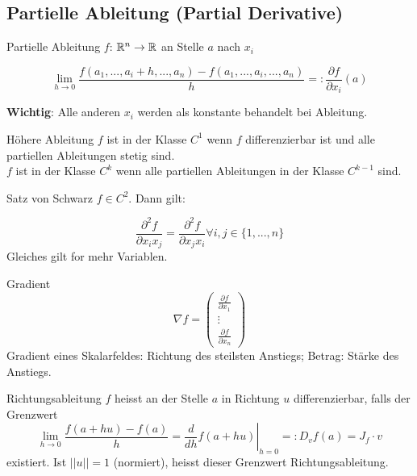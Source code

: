 \subsection{Partielle Ableitung (Partial Derivative)}
\begin{Definition}{Partielle Ableitung}{}
    $f$: $\mathbb{R}^n \rightarrow \mathbb{R}$ an Stelle $a$ nach $x_i$

    \[
        \lim_{h \rightarrow 0} \frac{f(a_1, ..., a_i + h, ..., a_n) - f(a_1, ..., a_i, ..., a_n)}{h} =: \frac{\partial f}{\partial x_i}(a)
    \]

\textbf{Wichtig}: Alle anderen $x_i$ werden als konstante behandelt bei Ableitung.
\end{Definition}

\begin{Definition}{Höhere Ableitung}{}
    $f$ ist in der Klasse $C^1$ wenn $f$ differenzierbar ist und alle partiellen Ableitungen stetig sind.\\
    $f$ ist in der Klasse $C^k$ wenn alle partiellen Ableitungen in der Klasse $C^{k-1}$ sind.
\end{Definition}

\begin{Satz}{Satz von Schwarz}{}
    $f \in C^2$. Dann gilt:

    \[
        \frac{\partial^2 f}{\partial x_i x_j} = \frac{\partial^2 f}{\partial x_j x_i} \forall i, j \in \{1, ..., n\}
    \]
    Gleiches gilt for mehr Variablen.

\end{Satz}


\begin{Definition}{Gradient}{}
    \[
    \nabla f =
        \begin{pmatrix}
            \frac{\partial f}{\partial x_1}\\
            \vdots\\
            \frac{\partial f}{\partial x_n}
        \end{pmatrix}
    \]
    Gradient eines Skalarfeldes: Richtung des steilsten Anstiegs; Betrag: Stärke des Anstiegs.

\end{Definition}

\begin{Definition}{Richtungsableitung}{}
    $f$ heisst an der Stelle $a$ in Richtung $u$ differenzierbar, falls der Grenzwert 
	\[
		\lim_{h\to0}\frac{f(a + hu) -f(a)}{h} =
		\left.\frac{d}{dh}f(a+hu)\right|_{h = 0}
		=: D_vf(a) = J_f \cdot v
	\]
existiert. Ist $||u|| = 1$ (normiert), heisst dieser Grenzwert Richtungsableitung.
\end{Definition}

